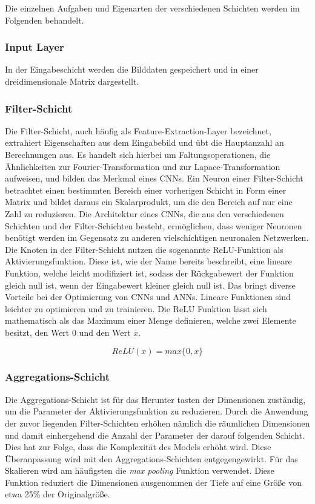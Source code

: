 Die einzelnen Aufgaben und Eigenarten der verschiedenen Schichten werden im Folgenden behandelt.

\subsubsection{Input Layer}
In der Eingabeschicht werden die Bilddaten gespeichert und in einer dreidimensionale Matrix dargestellt.\cite*{Sewak2018}

\subsubsection{Filter-Schicht}
Die Filter-Schicht, auch häufig als Feature-Extraction-Layer bezeichnet, extrahiert Eigenschaften aus dem Eingabebild und übt die Hauptanzahl an Berechnungen aus. 
Es handelt sich hierbei um Faltungsoperationen, die Ähnlichkeiten zur Fourier-Transformation und zur Lapace-Transformation aufweisen, und bilden das Merkmal eines CNNs.
Ein Neuron einer Filter-Schicht betrachtet einen bestimmten Bereich einer vorherigen Schicht in Form einer Matrix und bildet daraus ein Skalarprodukt, um die den Bereich auf nur eine Zahl zu reduzieren.
Die Architektur eines CNNs, die aus den verschiedenen Schichten und der Filter-Schichten besteht, ermöglichen, dass weniger Neuronen benötigt werden im Gegensatz zu anderen vielschichtigen neuronalen Netzwerken.\cite*{Sewak2018}
Die Knoten in der Filter-Schicht nutzen die sogenannte \ac{ReLU}-Funktion als Aktivierungsfunktion. Diese ist, wie der Name bereits beschreibt, eine lineare Funktion, welche leicht modifiziert ist, sodass der Rückgabewert der Funktion gleich null ist, wenn der Eingabewert kleiner gleich null ist. Das bringt diverse Vorteile bei der Optimierung von CNNs und ANNs. Lineare Funktionen sind leichter zu optimieren und zu trainieren. Die ReLU Funktion lässt sich mathematisch als das Maximum einer Menge definieren, welche zwei Elemente besitzt, den Wert $0$ und den Wert $x$.

\[ReLU(x) = max\{0, x\}\] \cite*{goodfellow2016}

\subsubsection{Aggregations-Schicht}
Die Aggregations-Schicht ist für das Herunter tasten der Dimensionen zuständig, um die Parameter der Aktivierungsfunktion zu reduzieren. Durch die Anwendung der zuvor liegenden Filter-Schichten erhöhen nämlich die räumlichen Dimensionen und damit einhergehend die Anzahl der Parameter der darauf folgenden Schicht. Dies hat zur Folge, dass die Komplexität des Models erhöht wird. Diese Überanpassung wird mit den Aggregations-Schichten entgegengewirkt.\cite*{Sewak2018}
Für das Skalieren wird am häufigsten die \textit{max pooling} Funktion verwendet. Diese Funktion reduziert die Dimensionen ausgenommen der Tiefe auf eine Größe von etwa 25\% der Originalgröße.\cite*{Keiron2015}

